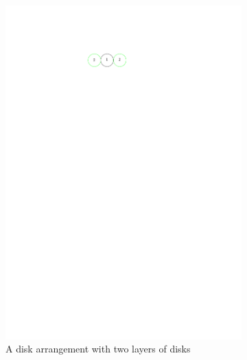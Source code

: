 \begin{figure}[H]
\begin{center}
  \begin{subfigure}[b]{0.24\textwidth}
	  \includegraphics[width=\textwidth]{graphics/degree2arrangement.pdf}
	  \caption{A disk arrangement with two layers of disks}
	  \label{fig:circlePacking1-1}
  \end{subfigure}
  \begin{subfigure}[b]{0.24\textwidth}

\end{subfigure}
\end{center}
\end{figure}
